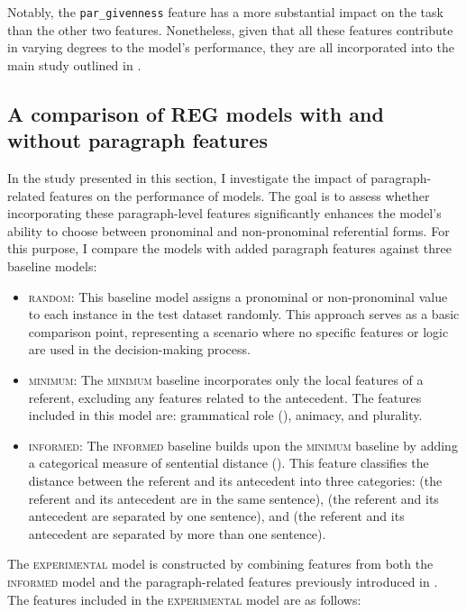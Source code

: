 Notably, the \texttt{par\_givenness} feature has a more substantial impact on the task than the other two features. Nonetheless, given that all these features contribute in varying degrees to the model's performance, they are all incorporated into the main study outlined in .


\subsection{A comparison of REG models with and without paragraph features}\label{subsec:models}

In the study presented in this section, I investigate the impact of paragraph-related features on the performance of \context models. The goal is to assess whether incorporating these paragraph-level features significantly enhances the model's ability to choose between pronominal and non-pronominal referential forms. For this purpose, I compare the models with added paragraph features against three baseline models:
 
\begin{itemize}
	\item \textsc{random:} This baseline model assigns a pronominal or non-pronominal value to each instance in the test dataset randomly. This approach serves as a basic comparison point, representing a scenario where no specific features or logic are used in the decision-making process.
	
	\item \textsc{minimum:} The \textsc{minimum} baseline incorporates only the local features of a referent, excluding any features related to the antecedent. The features included in this model are: grammatical role (), animacy, and plurality.
	
	\item \textsc{informed:} The \textsc{informed} baseline builds upon the \textsc{minimum} baseline by adding a categorical measure of sentential distance (). This feature classifies the distance between the referent and its antecedent into three categories:  (the referent and its antecedent are in the same sentence),  (the referent and its antecedent are separated by one sentence), and 
	 (the referent and its antecedent are separated by more than one sentence).
\end{itemize}

The \textsc{experimental} model is constructed by combining features from both the \textsc{informed} model and the paragraph-related features previously introduced in . The features included in the \textsc{experimental} model are as follows:

